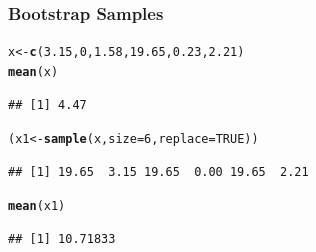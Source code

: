 \documentclass[12pt]{beamer}\usepackage[]{graphicx}\usepackage[]{color}
\makeatletter
\newcommand{\hlnum}[1]{\textcolor[rgb]{0.686,0.059,0.569}{#1}}%
\newcommand{\hlstd}[1]{\textcolor[rgb]{0.345,0.345,0.345}{#1}}%
\newcommand{\hlkwb}[1]{\textcolor[rgb]{0.69,0.353,0.396}{#1}}%
\newcommand{\hlkwc}[1]{\textcolor[rgb]{0.333,0.667,0.333}{#1}}%
\newcommand{\hlkwd}[1]{\textcolor[rgb]{0.737,0.353,0.396}{\textbf{#1}}}%
\newenvironment{kframe}{%
 \def\at@end@of@kframe{}%
 \ifinner\ifhmode%
  \def\at@end@of@kframe{\end{minipage}}%
  \begin{minipage}{\columnwidth}%
 \fi\fi%
 \def\FrameCommand##1{\hskip\@totalleftmargin \hskip-\fboxsep
 \colorbox{shadecolor}{##1}\hskip-\fboxsep
     \hskip-\linewidth \hskip-\@totalleftmargin \hskip\columnwidth}%
 \MakeFramed {\advance\hsize-\width
   \@totalleftmargin\z@ \linewidth\hsize
   \@setminipage}}%
 {\par\unskip\endMakeFramed%
 \at@end@of@kframe}
\newenvironment{knitrout}{}{} %
\makeatother
\begin{document}
\begin{frame}[fragile]
\frametitle{Bootstrap Samples}

\begin{knitrout}\footnotesize
{}\color{fgcolor}\begin{kframe}
\begin{alltt}
\hlstd{x} \hlkwb{<-} \hlkwd{c}\hlstd{(}\hlnum{3.15}\hlstd{,} \hlnum{0}\hlstd{,} \hlnum{1.58}\hlstd{,} \hlnum{19.65}\hlstd{,} \hlnum{0.23}\hlstd{,} \hlnum{2.21}\hlstd{)}
\hlkwd{mean}\hlstd{(x)}
\end{alltt}
\begin{verbatim}
## [1] 4.47
\end{verbatim}
\end{kframe}
\end{knitrout}

\pause
\begin{knitrout}\footnotesize
{}\color{fgcolor}\begin{kframe}
\begin{alltt}
\hlstd{(x1} \hlkwb{<-} \hlkwd{sample}\hlstd{(x,} \hlkwc{size} \hlstd{=} \hlnum{6}\hlstd{,} \hlkwc{replace} \hlstd{=} \hlnum{TRUE}\hlstd{))}
\end{alltt}
\begin{verbatim}
## [1] 19.65  3.15 19.65  0.00 19.65  2.21
\end{verbatim}
\begin{alltt}
\hlkwd{mean}\hlstd{(x1)}
\end{alltt}
\begin{verbatim}
## [1] 10.71833
\end{verbatim}
\end{kframe}
\end{knitrout}

\end{frame}

\end{document}
